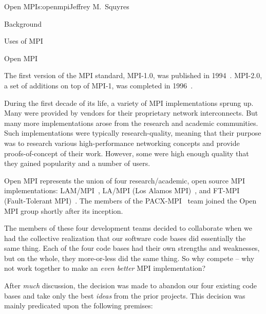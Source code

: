 \begin{aosachapter}{Open MPI}{s:openmpi}{Jeffrey M.\ Squyres}
\begin{aosasect1}{Background}
\begin{aosasect2}{Uses of MPI}
\end{aosasect2}


\begin{aosasect2}{Open MPI}

The first version of the MPI standard, MPI-1.0, was published in
1994~\cite{mpi_forum93:_mpi}.  
%
MPI-2.0, a set of additions on top of MPI-1, was completed in
1996~\cite{geist96:_mpi2_lyon}.

During the first decade of its life, a variety of MPI implementations
sprung up.  Many were provided by vendors for their proprietary
network interconnects.  But many more implementations arose from the
research and academic communities.  Such implementations were
typically research-quality, meaning that their purpose was to research
various high-performance networking concepts and provide
proofs-of-concept of their work.  However, some were high enough
quality that they gained popularity and a number of users.

Open MPI represents the union of four research/academic, open source
MPI implementations: LAM/MPI~\cite{squyres03:_compon_archit_lam_mpi},
LA/MPI (Los Alamos MPI)~\cite{lampi:ijjp}, and FT-MPI (Fault-Tolerant
MPI)~\cite{fagg04:_fault_toler_commun_librar_applic_high_perof}.
%
The members of the PACX-MPI~\cite{keller2003:pacx:jogc} team joined
the Open MPI group shortly after its inception.

The members of these four development teams decided to collaborate
when we had the collective realization that our software code bases
did essentially the same thing.  Each of the four code bases had their
own strengths and weaknesses, but on the whole, they more-or-less did
the same thing.  So why compete -- why not work together to make an
{\em even better} MPI implementation?

After {\em much} discussion, the decision was made to abandon our four
existing code bases and take only the best {\em ideas} from the prior
projects.  This decision was mainly predicated upon the following
premises:


\end{aosasect2}
\end{aosasect1}
\end{aosachapter}
